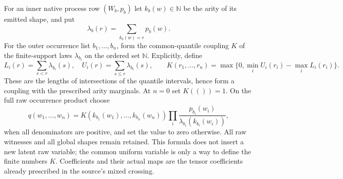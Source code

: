 \documentclass{article}
\begin{document}
For an inner native process row $(W_b,p_b)$ let $k_b(w)\in\mathbb N$ be the
arity of its emitted shape, and put
\[
 \lambda_b(r)=\sum_{k_b(w)=r}p_b(w).
\]
For the outer occurrence list $b_1,\ldots,b_n$, form the common-quantile
coupling $K$ of the finite-support laws $\lambda_{b_i}$ on the ordered set
$\mathbb N$. Explicitly, define
\[
 L_i(r)=\sum_{s<r}\lambda_{b_i}(s),\quad
 U_i(r)=\sum_{s\leq r}\lambda_{b_i}(s),\qquad
 K(r_1,\ldots,r_n)=
 \max\{0,\min_i U_i(r_i)-\max_i L_i(r_i)\}.
\]
These are the lengths of intersections of the quantile intervals, hence form
a coupling with the prescribed arity marginals. At $n=0$ set $K(())=1$.
On the full raw occurrence product choose
\[
 q(w_1,\ldots,w_n)=K(k_{b_1}(w_1),\ldots,k_{b_n}(w_n))
       \prod_i\frac{p_{b_i}(w_i)}{\lambda_{b_i}(k_{b_i}(w_i))}, \tag{Q}
\]
when all denominators are positive, and set the value to zero otherwise.
All raw witnesses and all global shapes remain retained. This formula does
not insert a new latent raw variable; the common uniform variable is only a
way to define the finite numbers $K$. Coefficients and their actual maps are
the tensor coefficients already prescribed in the source's mixed crossing.
\end{document}
